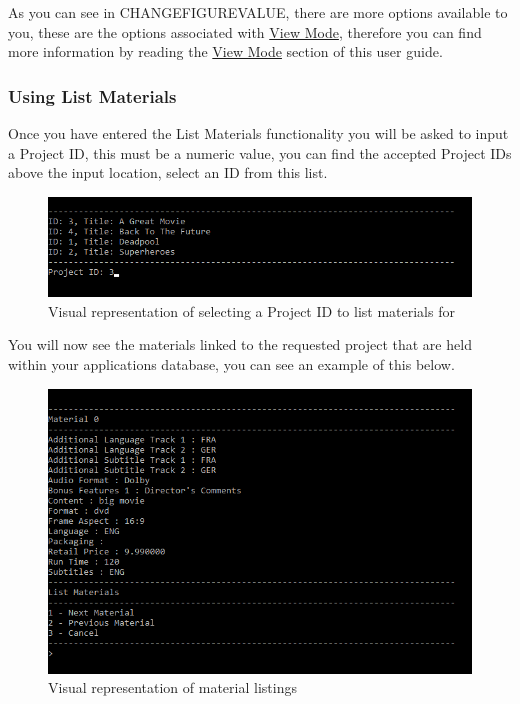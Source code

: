 \documentclass[
  english,
  a4paper,
,tablecaptionabove
]{scrartcl}
\begin{document}
As you can see in CHANGEFIGUREVALUE, there are more options available to
you, these are the options associated with
\protect\hyperlink{using-view-mode}{View Mode}, therefore you can find
more information by reading the \protect\hyperlink{using-view-mode}{View
Mode} section of this user guide.

\newpage

\hypertarget{using-list-materials}{%
\subsubsection{Using List Materials}\label{using-list-materials}}

Once you have entered the List Materials functionality you will be asked
to input a Project ID, this must be a numeric value, you can find the
accepted Project IDs above the input location, select an ID from this
list.

\begin{figure}
\centering
\includegraphics{images/user-guide/view-mode/list-materials-project-id.png}
\caption{Visual representation of selecting a Project ID to list
materials for}
\end{figure}

You will now see the materials linked to the requested project that are
held within your applications database, you can see an example of this
below.

\begin{figure}
\centering
\includegraphics{images/user-guide/view-mode/listed-materials.png}
\caption{Visual representation of material listings}
\end{figure}
\end{document}

